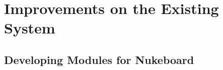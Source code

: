 
\chapter{Improvements on the Existing System} %

\label{Chapter3} %


\section{Developing Modules for Nukeboard}